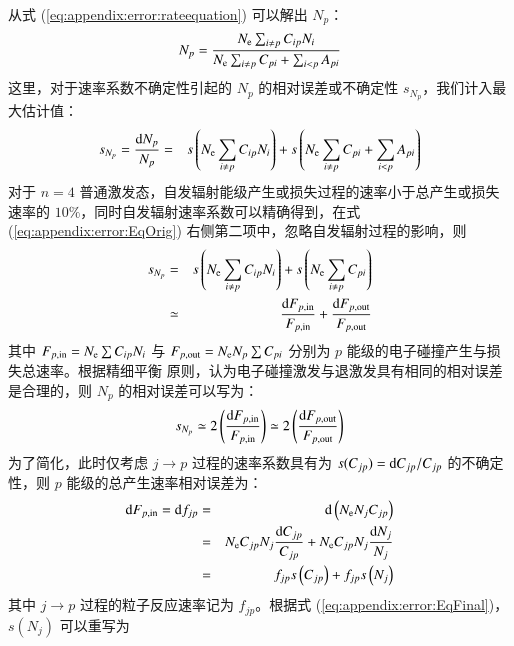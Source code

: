 从式 (\ref{eq:appendix:error:rateequation}) 可以解出 $N_p$：
\begin{equation}
N_p=\frac{N_{\rm e}\sum_{i\ne p}C_{ip}N_i}{N_{\rm e}\sum_{i\ne p}C_{pi}+\sum_{i<p}A_{pi}}
\label{eq:appendix:error:Np}
\end{equation}
这里，对于速率系数不确定性引起的 $N_p$ 的相对误差或不确定性 $s_{N_p}$，我们计入最大估计值\cite{YuChangxuan:book}：
\begin{eqnarray}
s_{N_p}=\frac{{\rm d}N_p}{N_p}& = &s\left(N_{\rm e}\sum_{i\ne p}C_{ip}N_i\right) + s\left(N_{\rm e}\sum_{i\ne p}C_{pi}+\sum_{i<p}A_{pi}\right)%
\label{eq:appendix:error:EqOrig}
\end{eqnarray}
对于 $n=4$ 普通激发态，自发辐射能级产生或损失过程的速率小于总产生或损失速率的 $10\%$，同时自发辐射速率系数可以精确得到\cite{NISTdatabase}，在式 (\ref{eq:appendix:error:EqOrig}) 右侧第二项中，忽略自发辐射过程的影响，则
\begin{eqnarray}
s_{N_p}& = &s\left(N_{\rm e}\sum_{i\ne p}C_{ip}N_i\right) + s\left(N_{\rm e}\sum_{i\ne p}C_{pi}\right) \nonumber\\
            & \simeq & \frac{{\rm d}F_{p,{\rm in}}}{F_{p,{\rm in}}} + \frac{{\rm d}F_{p,{\rm out}}}{F_{p,{\rm out}}}
\label{eq:appendix:error:EqIgnoreAqi}
\end{eqnarray}
其中 $F_{p,{\rm in}}=N_{\rm e}\sum C_{ip}N_i$ 与 $F_{p,{\rm out}}=N_{\rm e}N_p\sum C_{pi}$ 分别为 $p$ 能级的电子碰撞产生与损失总速率。根据精细平衡\cite{Lieberman2005-book} 原则，认为电子碰撞激发与退激发具有相同的相对误差是合理的，则 $N_p$ 的相对误差可以写为：
\begin{eqnarray}
s_{N_p} \simeq 2\left(\frac{{\rm d}F_{p,{\rm in}}}{F_{p,{\rm in}}}\right)
\simeq 2\left(\frac{{\rm d}F_{p,{\rm out}}}{F_{p,{\rm out}}}\right)
\label{eq:appendix:error:EqFinal}
\end{eqnarray}
为了简化，此时仅考虑 $j\to p$ 过程的速率系数具有为 $s(C_{jp})={\rm d}C_{jp}/C_{jp}$ 的不确定性\cite{Andrew2000PPCFSensitivity}，则 $p$ 能级的总产生速率相对误差为：
\begin{eqnarray}
{\rm d}F_{p,{\rm in}}={\rm d}f_{jp}&=&{\rm d}\left(N_{\rm e}N_jC_{jp}\right)\nonumber\\
&=&N_{\rm e}C_{jp}N_j\frac{{\rm d}C_{jp}}{C_{jp}}+N_{\rm e}C_{jp}N_j\frac{{\rm d}N_j}{N_j}\nonumber\\
&=&f_{jp}s\left(C_{jp}\right)+f_{jp}s\left(N_j\right)
\label{eq:appendix:error:dFin}
\end{eqnarray}
其中 $j\to p$ 过程的粒子反应速率记为 $f_{jp}$。根据式 (\ref{eq:appendix:error:EqFinal})，$s(N_j)$ 可以重写为
